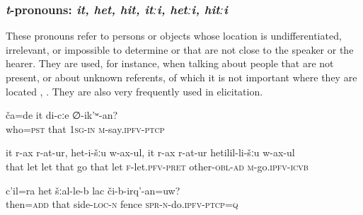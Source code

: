 
\subsubsection{\textit{t}-pronouns: \textit{it, het, hit, itːi, hetːi, hitːi}}
\label{sssec:t-pronouns}

These pronouns refer to persons or objects whose location is undifferentiated, irrelevant, or impossible to determine or that are not close to the speaker or the hearer. They are used, for instance, when talking about people that are not present, or about unknown referents, of which it is not important where they are located , . They are also very frequently used in elicitation.

\begin{exe}
	\ex	\label{Who was that (masc.) who told me that}
	\gll	ča=de	it	di-cːe	∅-ik'ʷ-an?\\
		who=\textsc{pst}	that	\textsc{1sg-in}	\textsc{m}-say.\textsc{ipfv-ptcp}\\
	\glt	{}

		\label{He left her and went to that, he left her and when to the next.}
	\sn
	\gll	it	r-ax	r-at-ur,	het-i-šːu	w-ax-ul,	it	r-ax	r-at-ur	hetilil-li-šːu	w-ax-ul\\
		that	\tsc{f-}let	let	that	go	that	let	\textsc{f}-let.\textsc{pfv}-\textsc{pret}	other-\textsc{obl-ad}	\textsc{m}-go.\textsc{ipfv}-\textsc{icvb}\\
	\glt	{}

    \pagebreak
		\label{talking about a stone fence that the speaker is building; both speaker} 
	\sn
	\gll	c'il=ra	het	šːal-le-b	lac	či-b-irq'-an=uw?\\	
		then=\textsc{add}	that	side-\textsc{loc}-\textsc{n}	fence	\textsc{spr}-\textsc{n}-do.\textsc{ipfv}-\textsc{ptcp}=\textsc{q} \\
	\glt	{}
\end{exe}

